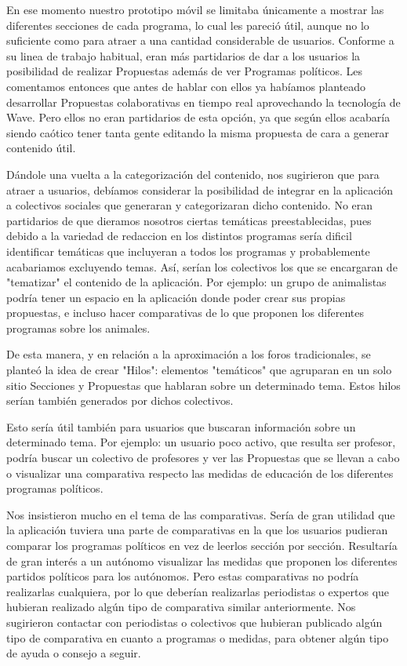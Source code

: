 En ese momento nuestro prototipo móvil se limitaba únicamente a mostrar las diferentes secciones de cada programa, lo cual les pareció útil, aunque no lo suficiente como para atraer a una cantidad considerable de usuarios. Conforme a su linea de trabajo habitual, eran más partidarios de dar a los usuarios la posibilidad de realizar Propuestas además de ver Programas políticos. Les comentamos entonces que antes de hablar con ellos ya habíamos planteado desarrollar Propuestas colaborativas en tiempo real aprovechando la tecnología de Wave. Pero ellos no eran partidarios de esta opción, ya que según ellos acabaría siendo caótico tener tanta gente editando la misma propuesta de cara a generar contenido útil. 

Dándole una vuelta a la categorización del contenido, nos sugirieron que para atraer a usuarios, debíamos considerar la posibilidad de integrar en la aplicación a colectivos sociales que generaran y categorizaran dicho contenido. No eran partidarios de que dieramos nosotros ciertas temáticas preestablecidas, pues debido a la variedad de redaccion en los distintos programas sería dificil identificar temáticas que incluyeran a todos los programas y probablemente acabariamos excluyendo temas. Así, serían los colectivos los que se encargaran de "tematizar" el contenido de la aplicación. Por ejemplo: un grupo de animalistas podría tener un espacio en la aplicación donde poder crear sus propias propuestas, e incluso hacer comparativas de lo que proponen los diferentes programas sobre los animales. 

De esta manera, y en relación a la aproximación a los foros tradicionales, se planteó la idea de crear "Hilos": elementos "temáticos" que agruparan en un solo sitio Secciones y Propuestas que hablaran sobre un determinado tema. Estos hilos serían también generados por dichos colectivos.

Esto sería útil también para usuarios que buscaran información sobre un determinado tema. Por ejemplo: un usuario poco activo, que resulta ser profesor, podría buscar un colectivo de profesores y ver las Propuestas que se llevan a cabo o visualizar una comparativa respecto las medidas de educación de los diferentes programas políticos.

Nos insistieron mucho en el tema de las comparativas. Sería de gran utilidad que la aplicación tuviera una parte de comparativas en la que los usuarios pudieran comparar los programas políticos en vez de leerlos sección por sección. Resultaría de gran interés a un autónomo visualizar las medidas que proponen los diferentes partidos políticos para los autónomos. Pero estas comparativas no podría realizarlas cualquiera, por lo que deberían realizarlas periodistas o expertos que hubieran realizado algún tipo de comparativa similar anteriormente. Nos sugirieron contactar con periodistas o colectivos que hubieran publicado algún tipo de comparativa en cuanto a programas o medidas, para obtener algún tipo de ayuda o consejo a seguir.


